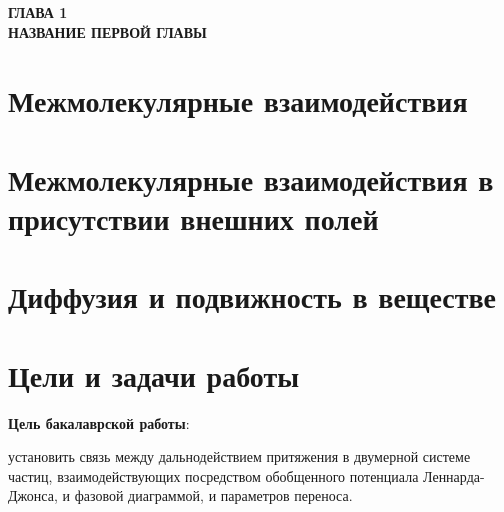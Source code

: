 
\newpage
\begin{center}
\textbf{ГЛАВА 1}\\
\textbf{НАЗВАНИЕ ПЕРВОЙ ГЛАВЫ}
\end{center}




\section{Межмолекулярные взаимодействия}\label{C1_1}



\section{Межмолекулярные взаимодействия в присутствии внешних полей}\label{C1_2}

\section{Диффузия и подвижность в веществе}\label{C1_3}


\section{Цели и задачи работы}

\textbf{Цель бакалаврской работы}: 

установить связь между дальнодействием притяжения в двумерной системе частиц, взаимодействующих посредством обобщенного потенциала Леннарда-Джонса, и фазовой диаграммой, и параметров переноса.
